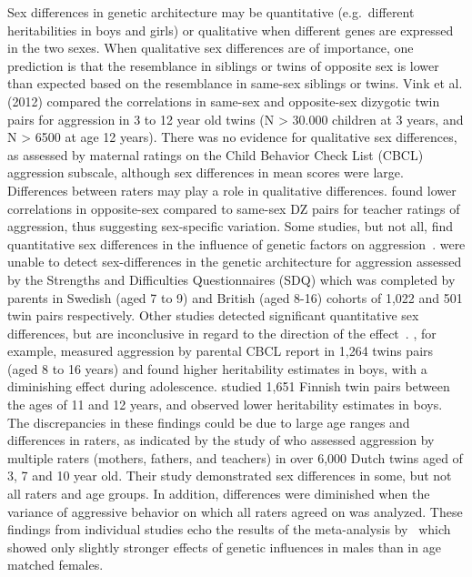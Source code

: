 Sex differences in genetic architecture may be quantitative (e.g.\ different heritabilities in boys and girls) or qualitative when different genes are expressed in the two sexes.
When qualitative sex differences are of importance, one prediction is that the resemblance in siblings or twins of opposite sex is lower than expected based on the resemblance in same-sex siblings or twins.
Vink et al. (2012) compared the correlations in same-sex and opposite-sex dizygotic twin pairs for aggression in 3 to 12 year old twins (N > 30.000 children at 3 years, and N > 6500 at age 12 years).
There was no evidence for qualitative sex differences, as assessed by maternal ratings on the Child Behavior Check List (CBCL) aggression subscale, although sex differences in mean scores were large.
Differences between raters may play a role in qualitative differences.
\citet{Vierikki2003} found lower correlations in opposite-sex compared to same-sex DZ pairs for teacher ratings of aggression, thus suggesting sex-specific variation.  
Some studies, but not all, find quantitative sex differences in the influence of genetic factors on aggression~\cite{Cadoret1995, Eley1999, Rhee2002}.
\citet{Eley1999} were unable to detect sex-differences in the genetic architecture for aggression assessed by the Strengths and Difficulties Questionnaires (SDQ) which was completed by parents in Swedish (aged 7 to 9) and British (aged 8-16) cohorts of 1,022 and 501 twin pairs respectively.
Other studies detected significant quantitative sex differences, but are inconclusive in regard to the direction of the effect~\cite{Silberg1994, Miles1997, Vierikko2003, vanBeijsterveldt2003}.
\citet{Silberg1994}, for example, measured aggression by parental CBCL report in 1,264 twins pairs (aged 8 to 16 years) and found higher heritability estimates in boys, with a diminishing effect during adolescence.
\citet{Vierikko2003} studied 1,651 Finnish twin pairs between the ages of 11 and 12 years, and observed lower heritability estimates in boys.
The discrepancies in these findings could be due to large age ranges and differences in raters, as indicated by the study of \citet{Hudziak2003} who assessed aggression by multiple raters (mothers, fathers, and teachers) in over 6,000 Dutch twins aged of 3, 7 and 10 year old.
Their study demonstrated sex differences in some, but not all raters and age groups.
In addition, differences were diminished when the variance of aggressive behavior on which all raters agreed on was analyzed.
These findings from individual studies echo the results of the meta-analysis by~\citet{Miles1997} which showed only slightly stronger effects of genetic influences in males than in age matched females.
